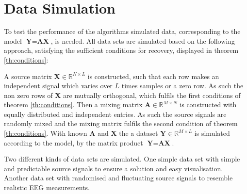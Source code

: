 \section{Data Simulation}\label{sec:dataset}
To test the performance of the algorithms simulated data, corresponding to the model $\textbf{Y}=\textbf{A}\textbf{X}$, is needed. All data sets are simulated based on the following approach, satisfying the sufficient conditions for recovery, displayed in theorem \ref{th:conditions}:
 
A source matrix $\textbf{X}\in \mathbb{R}^{N\times L}$ is constructed, such that each row makes an independent signal which varies over $L$ times samples or a zero row. As such the non zero rows of $\textbf{X}$ are mutually orthogonal, which fulfils the first conditions of theorem \ref{th:conditions}.   
Then a mixing matrix $\textbf{A}\in \mathbb{R}^{M\times N}$ is constructed with equally distributed and independent entries. As such the source signals are randomly mixed and the mixing matrix fulfils the second condition of theorem \ref{th:conditions}.
With known $\textbf{A}$ and $\textbf{X}$ the a dataset $\textbf{Y}\in \mathbb{R}^{M\times L}$ is simulated according to the model, by the matrix product $\textbf{Y}= \textbf{AX}$.  

Two different kinds of data sets are simulated.
One simple data set with simple and predictable source signals to ensure a solution and easy visualisation.
Another data set with randomised and fluctuating source signals to resemble realistic EEG measurements.

